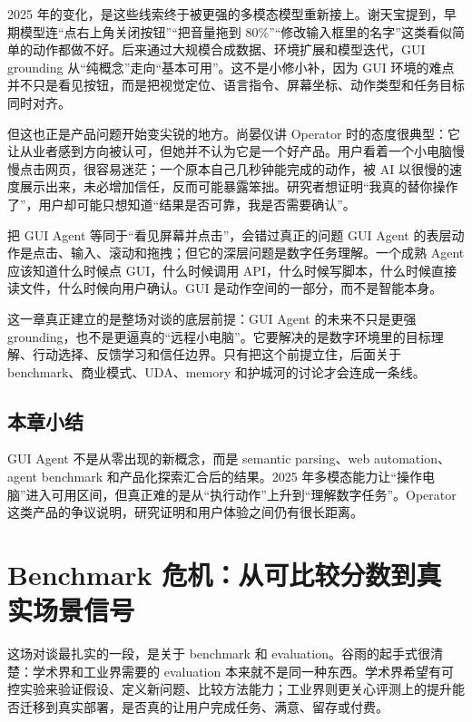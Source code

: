 \documentclass[a4paper]{article}
\begin{document}
2025 年的变化，是这些线索终于被更强的多模态模型重新接上。谢天宝提到，早期模型连“点右上角关闭按钮”“把音量拖到 80\%”“修改输入框里的名字”这类看似简单的动作都做不好。后来通过大规模合成数据、环境扩展和模型迭代，GUI grounding 从“纯概念”走向“基本可用”。这不是小修小补，因为 GUI 环境的难点并不只是看见按钮，而是把视觉定位、语言指令、屏幕坐标、动作类型和任务目标同时对齐。

但这也正是产品问题开始变尖锐的地方。尚晏仪讲 Operator 时的态度很典型：它让从业者感到方向被认可，但她并不认为它是一个好产品。用户看着一个小电脑慢慢点击网页，很容易迷茫；一个原本自己几秒钟能完成的动作，被 AI 以很慢的速度展示出来，未必增加信任，反而可能暴露笨拙。研究者想证明“我真的替你操作了”，用户却可能只想知道“结果是否可靠，我是否需要确认”。

\begin{warningbox}{把 GUI Agent 等同于“看见屏幕并点击”，会错过真正的问题}
GUI Agent 的表层动作是点击、输入、滚动和拖拽；但它的深层问题是数字任务理解。一个成熟 Agent 应该知道什么时候点 GUI，什么时候调用 API，什么时候写脚本，什么时候直接读文件，什么时候向用户确认。GUI 是动作空间的一部分，而不是智能本身。
\end{warningbox}

这一章真正建立的是整场对谈的底层前提：GUI Agent 的未来不只是更强 grounding，也不是更逼真的“远程小电脑”。它要解决的是数字环境里的目标理解、行动选择、反馈学习和信任边界。只有把这个前提立住，后面关于 benchmark、商业模式、UDA、memory 和护城河的讨论才会连成一条线。

\subsection{本章小结}

GUI Agent 不是从零出现的新概念，而是 semantic parsing、web automation、agent benchmark 和产品化探索汇合后的结果。2025 年多模态能力让“操作电脑”进入可用区间，但真正难的是从“执行动作”上升到“理解数字任务”。Operator 这类产品的争议说明，研究证明和用户体验之间仍有很长距离。

\section{Benchmark 危机：从可比较分数到真实场景信号}

这场对谈最扎实的一段，是关于 benchmark 和 evaluation。谷雨的起手式很清楚：学术界和工业界需要的 evaluation 本来就不是同一种东西。学术界希望有可控实验来验证假设、定义新问题、比较方法能力；工业界则更关心评测上的提升能否迁移到真实部署，是否真的让用户完成任务、满意、留存或付费。
\end{document}
